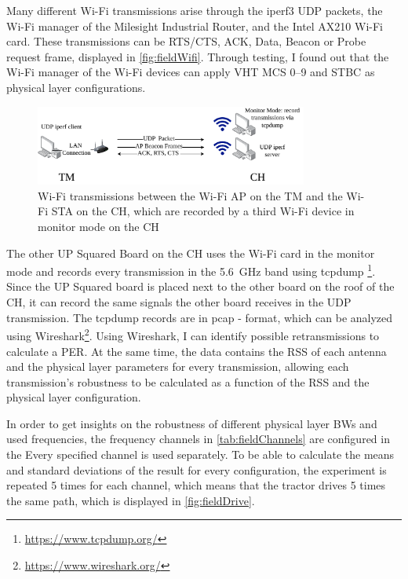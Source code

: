 Many different Wi-Fi transmissions arise through the iperf3 UDP packets, the Wi-Fi manager of the Milesight Industrial Router, and the Intel AX210 Wi-Fi card.
These transmissions can be RTS/CTS, ACK, Data, Beacon or Probe request frame, displayed in \autoref{fig:fieldWifi}.
Through testing, I found out that the Wi-Fi manager of the Wi-Fi devices can apply VHT \ac{MCS} \numrange{0}{9} and \ac{STBC} as physical layer configurations.

\begin{figure}[H]%
	\centering
	\includegraphics[width=0.8\textwidth]{figures/FieldExperimentwifi}
	\caption{Wi-Fi transmissions between the Wi-Fi AP on the \acf{TM} and the Wi-Fi \ac{STA} on the \acf{CH}, which
	are recorded by a third Wi-Fi device in monitor mode on the \ac{CH}}
	\label{fig:fieldWifi}%
\end{figure}

The other UP Squared Board on the \ac{CH} uses the Wi-Fi card in the monitor mode and records every transmission in the \SI{5.6}{\giga\hertz} band using tcpdump \footnote{\url{https://www.tcpdump.org/}}.
Since the UP Squared board is placed next to the other board on the roof of the \ac{CH}, it can record the same signals the other board receives in the UDP transmission.
The tcpdump records are in pcap - format, which can be analyzed using Wireshark\footnote{\url{https://www.wireshark.org/}}.
Using Wireshark, I can identify possible retransmissions to calculate a \ac{PER}.
At the same time, the data contains the \ac{RSS} of each antenna and the physical layer parameters for every
transmission, allowing each transmission's robustness to be calculated as a function of the \ac{RSS} and the physical
layer configuration.

In order to get insights on the robustness of different physical layer \ac{BW}s and used frequencies, the frequency channels in \autoref{tab:fieldChannels} are configured in the
Every specified channel is used separately.
To be able to calculate the means and standard deviations of the result for every configuration, the experiment is repeated \num{5} times for each channel,
which means that the tractor drives \num{5} times the same path, which is displayed in \autoref{fig:fieldDrive}.

